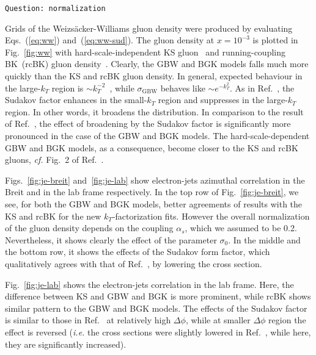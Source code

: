 \documentclass[11pt]{article}
\newcommand{\comment}[1]{\texttt{\color{red}#1}}
\begin{document}
\comment{Question: normalization}

Grids of the Weizs\"acker-Williams gluon density were produced by evaluating
Eqs.~(\ref{eq:ww}) and~(\ref{eq:ww-sud}).  The gluon density at $x=10^{-3}$ is
plotted in Fig.~\ref{fig:ww} with hard-scale-independent KS
gluon~\cite{vanHameren:2021sqc,Abdulov:2021ivr} and running-coupling BK~(rcBK)
gluon density~\cite{Balitsky:2006wa,Albacete:2010sy}. Clearly, the GBW and BGK models falls much more quickly
than the KS and rcBK gluon density. In general, expected behaviour in the
large-$k_T$ region is $\sim k_T^{-2}$~\cite{Dominguez:2010xd,Dominguez:2011wm},
while $\sigma_{\mathrm{GBW}}$ behaves like $\sim e^{-k_T^2}$.  As in
Ref.~\cite{vanHameren:2021sqc}, the Sudakov factor enhances in the small-$k_T$
region and suppresses in the large-$k_T$ region. In other words, it broadens the
distribution. In comparison to the result of Ref.~\cite{vanHameren:2021sqc}, the
effect of broadening by the Sudakov factor is significantly more pronounced in
the case of the GBW and BGK models. The hard-scale-dependent GBW and BGK models,
as a consequence, become closer to the KS and rcBK gluons, \textit{cf.} Fig.~2
of Ref.~\cite{vanHameren:2021sqc}.

Figs.~\ref{fig:je-breit} and~\ref{fig:je-lab} show electron-jets azimuthal
correlation in the Breit and in the lab frame respectively.  In the top row of Fig.~\ref{fig:je-breit}, we see, for both the
GBW and BGK models, better agreements of results with the KS and rcBK for the
new $k_T$-factorization fits. However the overall normalization of the gluon
density depends on the coupling $\alpha_s$, which we assumed to be 0.2.
Nevertheless, it shows clearly the effect of the parameter $\sigma_0$. In the
middle and the bottom row, it shows the effects of the Sudakov form factor,
which qualitatively agrees with that of Ref.~\cite{vanHameren:2021sqc}, by
lowering the cross section.  

Fig.~\ref{fig:je-lab} shows the electron-jets
correlation in the lab frame. Here, the difference between KS and GBW and BGK
is more prominent, while rcBK shows similar pattern to the GBW and BGK models.
The effects of the Sudakov factor is similar to those
in Ref.~\cite{vanHameren:2021sqc} at relatively high $\Delta \phi$, while at
smaller $\Delta \phi$ region the effect is reversed ({\it i.e.} the cross
sections were slightly lowered in Ref.~\cite{vanHameren:2021sqc}, while here,
they are significantly increased).
\end{document}

